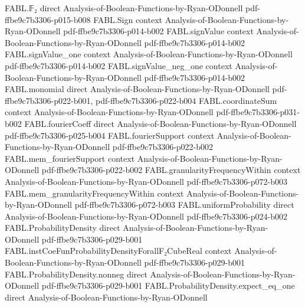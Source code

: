 \begin{theorem}
\leanok
{}
\proofstep
  {FABL.𝔽₂}
  {direct}
  {Analysis-of-Boolean-Functions-by-Ryan-ODonnell}
  {pdf-ffbe9c7b3306-p015-b008}
\proofstep
  {FABL.Sign}
  {context}
  {Analysis-of-Boolean-Functions-by-Ryan-ODonnell}
  {pdf-ffbe9c7b3306-p014-b002}
\proofstep
  {FABL.signValue}
  {context}
  {Analysis-of-Boolean-Functions-by-Ryan-ODonnell}
  {pdf-ffbe9c7b3306-p014-b002}
\proofstep
  {FABL.signValue_one}
  {context}
  {Analysis-of-Boolean-Functions-by-Ryan-ODonnell}
  {pdf-ffbe9c7b3306-p014-b002}
\proofstep
  {FABL.signValue_neg_one}
  {context}
  {Analysis-of-Boolean-Functions-by-Ryan-ODonnell}
  {pdf-ffbe9c7b3306-p014-b002}
\proofstep
  {FABL.monomial}
  {direct}
  {Analysis-of-Boolean-Functions-by-Ryan-ODonnell}
  {pdf-ffbe9c7b3306-p022-b001,
    pdf-ffbe9c7b3306-p022-b004}
\proofstep
  {FABL.coordinateSum}
  {context}
  {Analysis-of-Boolean-Functions-by-Ryan-ODonnell}
  {pdf-ffbe9c7b3306-p031-b002}
\proofstep
  {FABL.fourierCoeff}
  {direct}
  {Analysis-of-Boolean-Functions-by-Ryan-ODonnell}
  {pdf-ffbe9c7b3306-p025-b004}
\proofstep
  {FABL.fourierSupport}
  {context}
  {Analysis-of-Boolean-Functions-by-Ryan-ODonnell}
  {pdf-ffbe9c7b3306-p022-b002}
\proofstep
  {FABL.mem_fourierSupport}
  {context}
  {Analysis-of-Boolean-Functions-by-Ryan-ODonnell}
  {pdf-ffbe9c7b3306-p022-b002}
\proofstep
  {FABL.granularityFrequencyWithin}
  {context}
  {Analysis-of-Boolean-Functions-by-Ryan-ODonnell}
  {pdf-ffbe9c7b3306-p072-b003}
\proofstep
  {FABL.mem_granularityFrequencyWithin}
  {context}
  {Analysis-of-Boolean-Functions-by-Ryan-ODonnell}
  {pdf-ffbe9c7b3306-p072-b003}
\proofstep
  {FABL.uniformProbability}
  {direct}
  {Analysis-of-Boolean-Functions-by-Ryan-ODonnell}
  {pdf-ffbe9c7b3306-p024-b002}
\proofstep
  {FABL.ProbabilityDensity}
  {direct}
  {Analysis-of-Boolean-Functions-by-Ryan-ODonnell}
  {pdf-ffbe9c7b3306-p029-b001}
\proofstep
  {FABL.instCoeFunProbabilityDensityForallF₂CubeReal}
  {context}
  {Analysis-of-Boolean-Functions-by-Ryan-ODonnell}
  {pdf-ffbe9c7b3306-p029-b001}
\proofstep
  {FABL.ProbabilityDensity.nonneg}
  {direct}
  {Analysis-of-Boolean-Functions-by-Ryan-ODonnell}
  {pdf-ffbe9c7b3306-p029-b001}
\proofstep
  {FABL.ProbabilityDensity.expect_eq_one}
  {direct}
  {Analysis-of-Boolean-Functions-by-Ryan-ODonnell}

\end{theorem}
